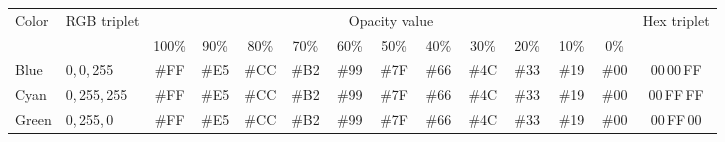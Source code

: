\begin{infobox}
\noindent \begin{centering}
\renewcommand{\tabcolsep}{2.9pt}%
\begin{tabular}{llcccccccccccc}
\toprule 
\multirow{2}{*}{{\footnotesize Color}} & \multirow{2}{*}{{\footnotesize RGB triplet}} & \multicolumn{11}{c}{{\footnotesize Opacity value}} & \multirow{2}{*}{{\footnotesize Hex triplet}}\tabularnewline
 &  & {\footnotesize 100\%} & {\footnotesize \,90\%\,} & {\footnotesize \,80\%\,} & {\footnotesize \,70\%\,} & {\footnotesize \,60\%\,} & {\footnotesize \,50\%\,} & {\footnotesize \,40\%\,} & {\footnotesize \,30\%\,} & {\footnotesize \,20\%\,} & {\footnotesize \,10\%\,} & {\footnotesize \,\,0\%\,\,} & \tabularnewline
\midrule
{\footnotesize Blue } & \multicolumn{1}{l}{{\footnotesize 0,\,0,\,255}} & {\footnotesize \cellcolor{blue}\#FF} & {\footnotesize \cellcolor{blue!90!shadecolor}\#E5} & {\footnotesize \cellcolor{blue!80!shadecolor}\#CC} & {\footnotesize \cellcolor{blue!70!shadecolor}\#B2} & {\footnotesize \cellcolor{blue!60!shadecolor}\#99} & {\footnotesize \cellcolor{blue!50!shadecolor}\#7F} & {\footnotesize \cellcolor{blue!40!shadecolor}\#66} & {\footnotesize \cellcolor{blue!30!shadecolor}\#4C} & {\footnotesize \cellcolor{blue!20!shadecolor}\#33} & {\footnotesize \cellcolor{blue!10!shadecolor}\#19} & {\footnotesize \#00} & {\footnotesize \cellcolor{blue!100!shadecolor}00\,00\,FF}\tabularnewline
{\footnotesize Cyan} & \multicolumn{1}{l}{{\footnotesize 0,\,255,\,255}} & {\footnotesize \cellcolor{ijcyan}\#FF} & {\footnotesize \cellcolor{ijcyan!90!shadecolor}\#E5} & {\footnotesize \cellcolor{ijcyan!80!shadecolor}\#CC} & {\footnotesize \cellcolor{ijcyan!70!shadecolor}\#B2} & {\footnotesize \cellcolor{ijcyan!60!shadecolor}\#99} & {\footnotesize \cellcolor{ijcyan!50!shadecolor}\#7F} & {\footnotesize \cellcolor{ijcyan!40!shadecolor}\#66} & {\footnotesize \cellcolor{ijcyan!30!shadecolor}\#4C} & {\footnotesize \cellcolor{ijcyan!20!shadecolor}\#33} & {\footnotesize \cellcolor{ijcyan!10!shadecolor}\#19} & {\footnotesize \#00} & {\footnotesize \cellcolor{ijcyan!100!shadecolor}00\,FF\,FF}\tabularnewline
{\footnotesize Green} & \multicolumn{1}{l}{{\footnotesize 0,\,255,\,0}} & {\footnotesize \cellcolor{green}\#FF} & {\footnotesize \cellcolor{green!90!shadecolor}\#E5} & {\footnotesize \cellcolor{green!80!shadecolor}\#CC} & {\footnotesize \cellcolor{green!70!shadecolor}\#B2} & {\footnotesize \cellcolor{green!60!shadecolor}\#99} & {\footnotesize \cellcolor{green!50!shadecolor}\#7F} & {\footnotesize \cellcolor{green!40!shadecolor}\#66} & {\footnotesize \cellcolor{green!30!shadecolor}\#4C} & {\footnotesize \cellcolor{green!20!shadecolor}\#33} & {\footnotesize \cellcolor{green!10!shadecolor}\#19} & {\footnotesize \#00} & {\footnotesize \cellcolor{green!100!shadecolor}00\,FF\,00}\tabularnewline

\end{tabular}
\end{centering}
\end{infobox}
